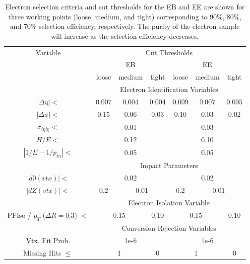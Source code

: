 \begin{table}[h]
    \centering
    \begin{tabular}{|c||c|c|c||c|c|c|}
         \hline
         Variable & \multicolumn{6}{c|}{Cut Thresholds} \\
         & \multicolumn{3}{c||}{EB} & \multicolumn{3}{c|}{EE} \\ \hline
         & loose & medium & tight & loose & medium & tight \\ \hline \hline
         & \multicolumn{6}{c|}{Electron Identification Variables} \\ \hline
         $|\Delta\eta| <$ & 0.007 & 0.004 & 0.004 & 0.009 & 0.007 & 0.005 \\ \hline
         $|\Delta\phi| <$ & 0.15 & 0.06 & 0.03 & 0.10 & 0.03 & 0.02 \\ \hline
         $\sigma_{i\eta i\eta} <$ & \multicolumn{3}{c||}{0.01} & \multicolumn{3}{c|}{0.03} \\ \hline
         $H/E <$ & \multicolumn{3}{c||}{0.12} & \multicolumn{3}{c|}{0.10} \\ \hline
         $|1/E - 1/p_{in}| <$ & \multicolumn{3}{c||}{0.05} & \multicolumn{3}{c|}{0.05} \\ \hline
         & \multicolumn{6}{c|}{Impact Parameters} \\ \hline
         $|d0(vtx)| < $ & \multicolumn{3}{c||}{0.02} & \multicolumn{3}{c|}{0.02} \\ \hline
         $|dZ(vtx)| < $ & 0.2 & \multicolumn{2}{c||}{0.01} & 0.2 & \multicolumn{2}{c|}{0.01} \\ \hline
         & \multicolumn{6}{c|}{Electron Isolation Variable} \\ \hline
         PFIso / $p_T$ ($\Delta R = 0.3$) $<$ & \multicolumn{2}{c|}{0.15} & 0.10 & \multicolumn{2}{c|}{0.15} & 0.10 \\ \hline
         & \multicolumn{6}{c|}{Conversion Rejection Variables} \\ \hline
         Vtx. Fit Prob. & \multicolumn{3}{c||}{1e-6} & \multicolumn{3}{c|}{1e-6} \\ \hline
         Missing Hits $\leq$ & \multicolumn{2}{c|}{1} & 0 & \multicolumn{2}{c|}{1} & 0 \\ \hline 
    \end{tabular}
    \caption[Electron selection criteria and cut thresholds]{Electron selection criteria and cut thresholds for the EB and EE are shown for three working points (loose, medium, and tight) corresponding to 90\%, 80\%, and 70\% selection efficiency, respectively. The purity of the electron sample will increase as the selection efficiency decreases.}
    \label{tab:electron_event_selection_cuts}
\end{table}

